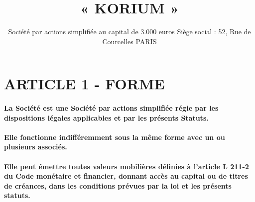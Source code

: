 \documentclass[a4paper, 11pt]{article}
\begin{document}
\title{« KORIUM »}
\author{
  Société par actions simplifiée au capital de 3.000 euros\vspace
  Siège social : 52, Rue de Courcelles PARIS\vspace
}

\maketitle

\section*{ARTICLE 1 - FORME}

\paragraph{
  La Société est une Société par actions simplifiée régie par les dispositions  légales applicables et par les présents Statuts.
}

\paragraph{
  Elle fonctionne indifféremment sous la même forme avec un ou plusieurs associés.
}

\paragraph{
  Elle peut émettre toutes valeurs mobilières définies à l'article L 211-2 du Code monétaire et financier, donnant accès au capital ou de titres de créances, dans les conditions prévues par la loi et les présents statuts.
}
\end{document}

